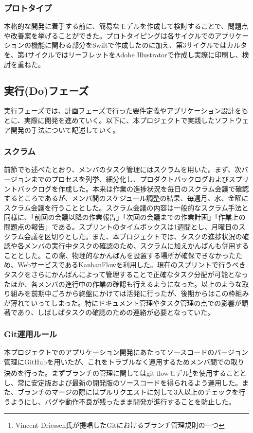 \subsubsection{プロトタイプ}
本格的な開発に着手する前に、簡易なモデルを作成して検討することで、問題点や改善案を挙げることができた。プロトタイピングは各サイクルでのアプリケーションの機能に関わる部分をSwiftで作成したのに加え、第3サイクルではカルタを、第4サイクルではリーフレットをAdobe Illustratorで作成し実際に印刷し、検討を重ねた。
\subsection{実行(Do)フェーズ}
実行フェーズでは、計画フェーズで行った要件定義やアプリケーション設計をもとに、実際に開発を進めていく。以下に、本プロジェクトで実践したソフトウェア開発の手法について記述していく。
\subsubsection{スクラム}
前節でも述べたとおり、メンバのタスク管理にはスクラムを用いた。まず、次バージョンまでのプロセスを列挙、細分化し、プロダクトバックログおよびスプリントバックログを作成した。本来は作業の進捗状況を毎日のスクラム会議で確認するところであるが、メンバ間のスケジュール調整の結果、毎週月、水、金曜にスクラム会議を行うこととした。スクラム会議の内容は一般的なスクラム手法と同様に、「前回の会議以降の作業報告」「次回の会議までの作業計画」「作業上の問題点の報告」である。スプリントのタイムボックスは1週間とし、月曜日のスクラム会議を区切りとした。また、本プロジェクトでは、タスクの進捗状況の確認や各メンバの実行中タスクの確認のため、スクラムに加えかんばんも併用することとした。この際、物理的なかんばんを設置する場所が確保できなかったため、WebサービスであるKanbanFlowを利用した。現在のスプリントで行うべきタスクをさらにかんばんによって管理することで正確なタスク分配が可能となったほか、各メンバの進行中の作業の確認も行えるようになった。以上のような取り組みを前期中ごろから終盤にかけては活発に行ったが、後期からはこの枠組みが薄れていってしまった。特にドキュメント管理やタスク管理の点での影響が顕著であり、しばしばタスクの確認のための連絡が必要となっていた。
\subsubsection{Git運用ルール}
本プロジェクトでのアプリケーション開発にあたってソースコードのバージョン管理にGitHubを用いたが、これをトラブルなく運用するためメンバ間での取り決めを行った。まずブランチの管理に関してはgit-flowモデル\footnote{Vincent Driessen氏が提唱したGitにおけるブランチ管理規則の一つ}を使用することとし、常に安定版および最新の開発版のソースコードを得られるよう運用した。また、ブランチのマージの際にはプルリクエストに対して3人以上のチェックを行うようにし、バグや動作不良が残ったまま開発が進行することを防止した。
